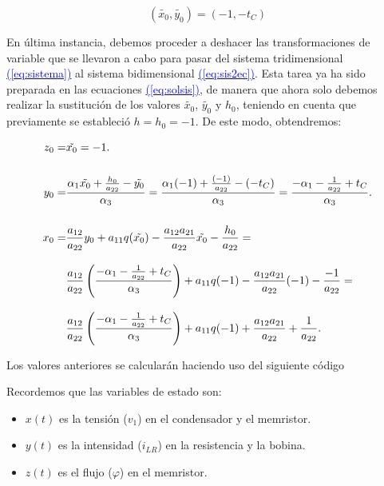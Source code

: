 \documentclass[12pt,a4paper]{report} %
\newcommand{\eref}[1]{\hyperref[#1]{\textcolor{blue}{(\ref*{#1})}}}
\begin{document}
	\begin{equation}
		\label{eq:desh2}
		(\tilde{x_0},\tilde{y_0}) = (-1,-t_C)
	\end{equation}\smallskip
	
	En última instancia, debemos proceder a deshacer las transformaciones de variable que se llevaron a cabo para pasar del sistema tridimensional \eref{eq:sistema} al sistema bidimensional \eref{eq:sis2ec}. Esta tarea ya ha sido preparada en las ecuaciones \eref{eq:solsis}, de manera que ahora solo debemos realizar la sustitución de los valores $\tilde{x_0}$, $\tilde{y_0}$ y $h_0$, teniendo en cuenta que previamente se estableció $h = h_0=-1$. De este modo, obtendremos:
	
\begin{subequations}
	\label{eq:deshh}
	\begin{align}
		z_0=&\tilde{x_0}=-1. \label{eq:desh3} \\[5mm]
		y_0=& \frac{\alpha_1\tilde{x_0}+\frac{h_0}{a_{22}}-\tilde{y_0}}{\alpha_3} = \frac{\alpha_1(-1)+\frac{(-1)}{a_{22}}-(-t_C)}{\alpha_3} = \frac{-\alpha_1-\frac{1}{a_{22}}+t_C}{\alpha_3} \label{eq:desh4}. \\[5mm]
		x_0= &\frac{a_{12}}{a_{22}}y_0+a_{11}q(\tilde{x_0})-\frac{a_{12}a_{21}}{a_{22}}\tilde{x_0}-\frac{h_0}{a_{22}}=\notag\\[3mm] &\frac{a_{12}}{a_{22}}  \left( \frac{-\alpha_1-\frac{1}{a_{22}}+t_C}{\alpha_3} \right)+a_{11}q(-1)-\frac{a_{12}a_{21}}{a_{22}}(-1)-\frac{-1}{a_{22}}=\notag\\[3mm]
		&\frac{a_{12}}{a_{22}}  \left( \frac{-\alpha_1-\frac{1}{a_{22}}+t_C}{\alpha_3} \right)+a_{11}q(-1)+\frac{a_{12}a_{21}}{a_{22}}+\frac{1}{a_{22}}. \label{eq:desh5}
	\end{align}
\end{subequations}

\newpage

	\noindent Los valores anteriores se calcularán haciendo uso del siguiente código
	
	\vspace{0.5cm}
	
	\vspace{1cm}
	
	\newpage
	
	\noindent Recordemos que las variables de estado son:
	\begin{itemize}
		\item $x(t)$ es la tensión ($v_1$) en el condensador y el memristor.
		\item $y(t)$ es la intensidad ($i_{LR}$) en la resistencia y la bobina.
		\item $z(t)$ es el flujo ($\varphi$) en el memristor.
	\end{itemize}
	
\end{document}
